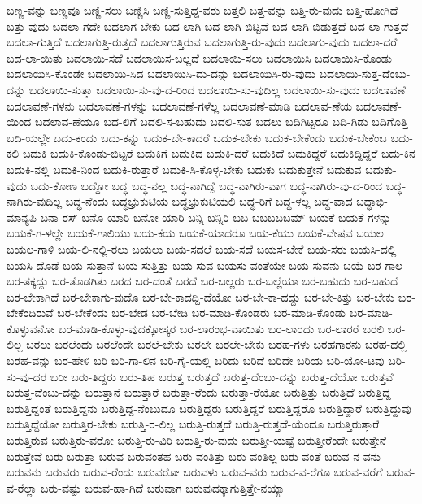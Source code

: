 {ಬಣ್ಣ-ವನ್ನು
ಬಣ್ಣವೂ
ಬಣ್ಣಿ-ಸಲು
ಬಣ್ಣಿಸಿ
ಬಣ್ಣಿ-ಸುತ್ತಿದ್ದ-ವರು
ಬತ್ತಲಿ
ಬತ್ತ-ವನ್ನು
ಬತ್ತಿ-ರು-ವುದು
ಬತ್ತಿ-ಹೋಗಿದೆ
ಬತ್ತು-ವುದು
ಬದಲಾ-ಗದೇ
ಬದಲಾಗ-ಬೇಕು
ಬದ-ಲಾಗಿ
ಬದ-ಲಾಗಿ-ಬಿಟ್ಟಿವೆ
ಬದ-ಲಾಗಿ-ಬಿಡುತ್ತದೆ
ಬದ-ಲಾ-ಗುತ್ತದೆ
ಬದಲಾ-ಗುತ್ತಿದೆ
ಬದಲಾಗುತ್ತಿ-ರುತ್ತದೆ
ಬದಲಾಗುತ್ತಿರುವ
ಬದಲಾಗುತ್ತಿ-ರು-ವುದು
ಬದಲಾಗು-ವುದು
ಬದಲಾ-ದರೆ
ಬದ-ಲಾ-ಯಿತು
ಬದಲಾಯಿ-ಸದೆ
ಬದಲಾಯಿಸ-ಬಲ್ಲದೆ
ಬದಲಾಯಿ-ಸಲು
ಬದಲಾಯಿಸಿ
ಬದಲಾಯಿಸಿ-ಕೊಂಡು
ಬದಲಾಯಿಸಿ-ಕೊಂಡೇ
ಬದಲಾಯಿ-ಸಿದ
ಬದಲಾಯಿಸಿ-ದು-ದನ್ನು
ಬದಲಾಯಿಸಿ-ರು-ವುದು
ಬದಲಾಯಿ-ಸುತ್ತ-ದೆಂಬು-ದನ್ನು
ಬದಲಾಯಿ-ಸುತ್ತಾ
ಬದಲಾಯಿ-ಸು-ವು-ದ-ರಿಂದ
ಬದಲಾಯಿ-ಸು-ವುದಿಲ್ಲ
ಬದಲಾಯಿ-ಸು-ವುದು
ಬದಲಾವಣೆ
ಬದಲಾವಣೆ-ಗಳನು
ಬದಲಾವಣೆ-ಗಳನ್ನು
ಬದಲಾವಣೆ-ಗಳೆಲ್ಲ
ಬದಲಾವಣೆ-ಮಾಡಿ
ಬದಲಾವ-ಣೆಯ
ಬದಲಾವಣೆ-ಯಿಂದ
ಬದಲಾವ-ಣೆಯೂ
ಬದ-ಲಿಗೆ
ಬದಲಿ-ಸ-ಬಹುದು
ಬದಲಿ-ಸುತ
ಬದಲು
ಬದಿಗಿಟ್ಟರೂ
ಬದಿ-ಗಿಡು
ಬದಿಗೊತ್ತಿ
ಬದಿ-ಯಲ್ಲೇ
ಬದು-ಕಂದು
ಬದು-ಕನ್ನು
ಬದುಕ-ಬೇ-ಕಾದರೆ
ಬದುಕ-ಬೇಕು
ಬದುಕ-ಬೇಕೆಂದು
ಬದುಕ-ಬೇಕೆಂಬ
ಬದು-ಕಲಿ
ಬದುಕಿ
ಬದುಕಿ-ಕೊಂಡು-ಬಿಟ್ಟರೆ
ಬದುಕಿಗೆ
ಬದುಕಿದ
ಬದುಕಿ-ದರೆ
ಬದುಕಿದೆ
ಬದುಕಿದ್ದರೆ
ಬದುಕಿದ್ದಿದ್ದರೆ
ಬದು-ಕಿನ
ಬದುಕಿ-ನಲ್ಲಿ
ಬದುಕಿ-ನಿಂದ
ಬದುಕಿ-ರುತ್ತಾರೆ
ಬದುಕಿ-ಸಿ-ಕೊಳ್ಳ-ಬೇಕು
ಬದುಕು
ಬದುಕುತ್ತೇನೆ
ಬದುಕುವ
ಬದುಕು-ವುದು
ಬದು-ಕೋಣ
ಬದ್ದೋ
ಬದ್ಧ
ಬದ್ಧ-ನಲ್ಲ
ಬದ್ಧ-ನಾಗಿದ್ದೆ
ಬದ್ಧ-ನಾಗಿರು-ವಾಗ
ಬದ್ಧ-ನಾಗಿರು-ವು-ದ-ರಿಂದ
ಬದ್ಧ-ನಾಗಿರು-ವುದಿಲ್ಲ
ಬದ್ಧ-ನೆಂದು
ಬದ್ಧಭ್ರುಕುಟಿಯ
ಬದ್ಧಭ್ರುಕುಟಿಯಲಿ
ಬದ್ಧ-ರಿಗೆ
ಬದ್ಧ-ಳಲ್ಲ
ಬದ್ಧ-ವಾದ
ಬದ್ಧಾಭಿ-ಮಾನ್ಯಪಿ
ಬನಾ-ರಸ್
ಬನೊ-ಯಾರಿ
ಬನೋ-ಯಾರಿ
ಬನ್ನಿ
ಬನ್ನಿರಿ
ಬಬ
ಬಬಬಬಬಮ್
ಬಯಕೆ
ಬಯಕೆ-ಗಳನ್ನು
ಬಯಕೆ-ಗ-ಳಲ್ಲೇ
ಬಯಕೆ-ಗಾಲಿಯು
ಬಯ-ಕೆಯ
ಬಯಕೆ-ಯಾದರೂ
ಬಯ-ಕೆಯು
ಬಯಕೆ-ವೇಷವ
ಬಯಲ
ಬಯಲ-ಗಾಳಿ
ಬಯ-ಲಿ-ನಲ್ಲಿ-ರಲು
ಬಯಲು
ಬಯ-ಸದಲೆ
ಬಯ-ಸದೆ
ಬಯಸ-ಬೇಕೆ
ಬಯ-ಸರು
ಬಯಸಿ-ದಲ್ಲಿ
ಬಯಸಿ-ದೊಡೆ
ಬಯ-ಸುತ್ತಾನೆ
ಬಯ-ಸುತ್ತಿತ್ತು
ಬಯ-ಸುವ
ಬಯಸು-ವಂತೆಯೇ
ಬಯ-ಸುವನು
ಬಯೆ
ಬರ-ಗಾಲ
ಬರ-ತಕ್ಕದ್ದು
ಬರ-ತೊಡಗಿತು
ಬರದ
ಬರ-ದಂತೆ
ಬರದೆ
ಬರ-ಬಲ್ಲರು
ಬರ-ಬಲ್ಲೆಯಾ
ಬರ-ಬಹುದು
ಬರ-ಬಹುದೆ
ಬರ-ಬೇಕಾಗಿದೆ
ಬರ-ಬೇಕಾಗು-ವುದೊ
ಬರ-ಬೇ-ಕಾದದ್ದಿ-ದೆಯೋ
ಬರ-ಬೇ-ಕಾ-ದದ್ದು
ಬರ-ಬೇ-ಕಿತ್ತು
ಬರ-ಬೇಕು
ಬರ-ಬೇಕೆಂದಿರುವೆ
ಬರ-ಬೇಕೆಂದು
ಬರ-ಬೇಡ
ಬರ-ಬೇಡಿ
ಬರ-ಮಾಡಿ-ಕೊಂಡರು
ಬರ-ಮಾಡಿ-ಕೊಂಡು
ಬರ-ಮಾಡಿ-ಕೊಳ್ಳುವನೋ
ಬರ-ಮಾಡಿ-ಕೊಳ್ಳು-ವುದಕ್ಕೋಸ್ಕರ
ಬರ-ಲಾರಂಭ-ವಾಯಿತು
ಬರ-ಲಾರದು
ಬರ-ಲಾರರೆ
ಬರಲಿ
ಬರ-ಲಿಲ್ಲ
ಬರಲು
ಬರಲೆಂದು
ಬರಲೆಂದೇ
ಬರಲೆ-ಬೇಕು
ಬರಲೇ
ಬರಲೇ-ಬೇಕು
ಬರಹ-ಗಳು
ಬರಹಗಾರನು
ಬರಹ-ದಲ್ಲಿ
ಬರಹ-ವನ್ನು
ಬರ-ಹೇಳಿ
ಬರಿ
ಬರಿ-ಗಾ-ಲಿನ
ಬರಿ-ಗೈ-ಯಲ್ಲಿ
ಬರಿದು
ಬರಿದೆ
ಬರಿದೇ
ಬರಿಯ
ಬರಿ-ಯೋ-ಟವು
ಬರಿ-ಸು-ವು-ದರ
ಬರೀ
ಬರು-ತಿದ್ದರು
ಬರು-ತಿಹ
ಬರುತ್ತ
ಬರುತ್ತದೆ
ಬರುತ್ತ-ದೆಂಬು-ದನ್ನು
ಬರುತ್ತ-ದೆಯೋ
ಬರುತ್ತವೆ
ಬರುತ್ತ-ವೆಂಬು-ದನ್ನು
ಬರುತ್ತಾನೆ
ಬರುತ್ತಾರೆ
ಬರುತ್ತಾ-ರೆಂದು
ಬರುತ್ತಾ-ರೆಯೋ
ಬರುತ್ತಿತ್ತು
ಬರುತ್ತಿದೆ
ಬರುತ್ತಿದ್ದ
ಬರುತ್ತಿದ್ದಂತೆ
ಬರುತ್ತಿದ್ದನು
ಬರುತ್ತಿದ್ದ-ನೆಂಬುದೂ
ಬರುತ್ತಿದ್ದರು
ಬರುತ್ತಿದ್ದರೆ
ಬರುತ್ತಿದ್ದರೊ
ಬರುತ್ತಿದ್ದಾರೆ
ಬರುತ್ತಿದ್ದುವು
ಬರುತ್ತಿದ್ದೆಯೋ
ಬರುತ್ತಿರ-ಬೇಕು
ಬರುತ್ತಿ-ರ-ಲಿಲ್ಲ
ಬರುತ್ತಿ-ರುತ್ತದೆ
ಬರುತ್ತಿ-ರುತ್ತದೆ-ಯೆಂದೂ
ಬರುತ್ತಿರುತ್ತಾರೆ
ಬರುತ್ತಿರುವ
ಬರುತ್ತಿರು-ವರೋ
ಬರುತ್ತಿ-ರು-ವಿರಿ
ಬರುತ್ತಿ-ರು-ವುದು
ಬರುತ್ತೀ-ಯಷ್ಟೆ
ಬರುತ್ತೀರೆಂದೇ
ಬರುತ್ತೇನೆ
ಬರುತ್ತೇವೆ
ಬರು-ಬರುತ್ತಾ
ಬರುವ
ಬರುವಂತಹ
ಬರು-ವಂತಿತ್ತು
ಬರು-ವಂತಿಲ್ಲ
ಬರು-ವಂತೆ
ಬರುವ-ನ-ವನು
ಬರುವನು
ಬರುವರು
ಬರುವ-ರೆಂದು
ಬರುವರೋ
ಬರುವಳು
ಬರುವ-ವರು
ಬರುವ-ವ-ರೆಗೂ
ಬರುವ-ವರೆಗೆ
ಬರುವ-ವ-ರೆಲ್ಲಾ
ಬರು-ವಷ್ಟು
ಬರುವ-ಹಾ-ಗಿದೆ
ಬರುವಾಗ
ಬರುವುದಕ್ಕಾಗುತ್ತಿತ್ತೇ-ನಯ್ಯಾ
}
